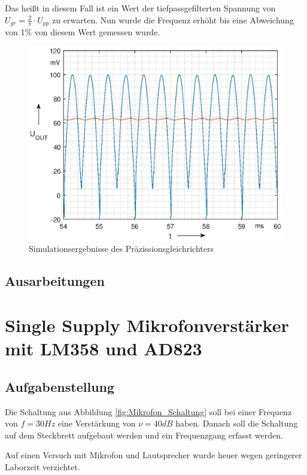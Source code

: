 Das heißt in diesem Fall ist ein Wert der tiefpassgefilterten Spannung von $U_{gr} =\frac{2}{\pi}\cdot U_{pp}$ zu erwarten. Nun wurde die Frequenz erhöht bis eine Abweichung von 1\% von diesem Wert gemessen wurde.

\begin{figure}[H]
    \centering
    \includegraphics[width=\costumPicWidth]{Lab_3/Plots/Gleichrichter.eps}
    \caption{Simulationsergebnisse des Präzissionsgleichrichters}
    \label{fig:sim_Gleichrichter}
\end{figure}
\subsection{Ausarbeitungen}

\section{Single Supply Mikrofonverstärker mit LM358 und AD823}
\subsection{Aufgabenstellung}
Die Schaltung aus Abbildung \ref{fig:Mikrofon_Schaltung} soll bei einer Frequenz von $f=30Hz$ eine Verstärkung von $\nu = 40dB$ haben. 
Danach soll die Schaltung auf dem Steckbrett aufgebaut werden und ein Frequenzgang erfasst werden.

Auf einen Versuch mit Mikrofon und Lautsprecher wurde heuer wegen geringerer Laborzeit verzichtet. 

